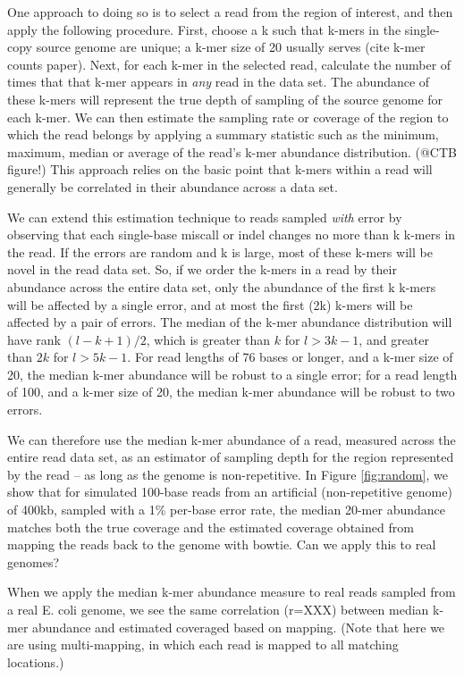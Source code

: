 \documentclass[10pt,draft]{article}
\begin{document}
One approach to doing so is to select a read from the region of
interest, and then apply the following procedure. First, choose a k
such that k-mers in the single-copy source genome are unique; a k-mer
size of 20 usually serves (cite k-mer counts paper).  Next, for each
k-mer in the selected read, calculate the number of times that that
k-mer appears in {\em any} read in the data set.  The abundance of
these k-mers will represent the true depth of sampling of the source
genome for each k-mer.  We can then estimate the sampling rate or
coverage of the region to which the read belongs by applying a summary
statistic such as the minimum, maximum, median or average of the
read's k-mer abundance distribution. (@CTB figure!)  This approach
relies on the basic point that k-mers within a read will generally be
correlated in their abundance across a data set.

We can extend this estimation technique to reads sampled {\em with}
error by observing that each single-base miscall or indel changes no
more than k k-mers in the read.  If the errors are random and k is
large, most of these k-mers will be novel in the read data set.  So,
if we order the k-mers in a read by their abundance across the entire
data set, only the abundance of the first k k-mers will be affected by
a single error, and at most the first (2k) k-mers will be affected by
a pair of errors.  The median of the k-mer abundance distribution will
have rank $(l - k + 1) / 2$, which is greater than $k$ for $l > 3k-1$,
and greater than $2k$ for $l > 5k-1$.  For read lengths of 76
bases or longer, and a k-mer size of 20, the median k-mer abundance
will be robust to a single error; for a read length of 100, and a
k-mer size of 20, the median k-mer abundance will be robust to two
errors.

We can therefore use the median k-mer abundance of a read, measured
across the entire read data set, as an estimator of sampling depth for
the region represented by the read -- as long as the genome is
non-repetitive.  In Figure \ref{fig:random}, we show that for
simulated 100-base reads from an artificial (non-repetitive genome) of
400kb, sampled with a 1\% per-base error rate, the median 20-mer
abundance matches both the true coverage and the estimated coverage
obtained from mapping the reads back to the genome with bowtie.  Can
we apply this to real genomes?

When we apply the median k-mer abundance measure to real reads sampled
from a real E. coli genome, we see the same correlation (r=XXX)
between median k-mer abundance and estimated coveraged based on mapping.
(Note that here we are using multi-mapping, in which each read is mapped
to all matching locations.)
\end{document}
